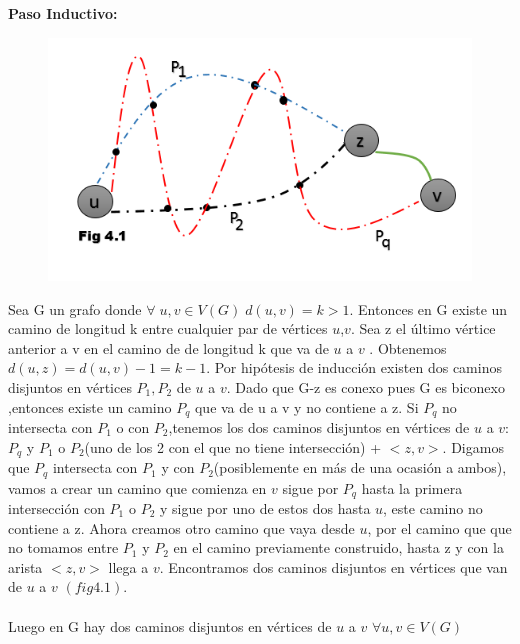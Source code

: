 \documentclass{article}
\begin{document}
    \noindent \textbf{Paso Inductivo:}\\
    \begin{figure}[H]
        \includegraphics[scale = 0.327]{img/4fig1.png}
        \centering
    \end{figure}
    \noindent Sea G un grafo donde $\forall\; u,v\in V(G)\; d(u,v)=k>1$. Entonces en G existe un camino de longitud k entre 
    cualquier par de v\'ertices $u$,$v$. Sea z el \'ultimo v\'ertice anterior a v en el camino de de longitud k que va de
    $u$ a $v$ . Obtenemos $d(u,z)=d(u,v)-1=k-1$. Por hip\'otesis de inducci\'on existen dos caminos disjuntos en v\'ertices 
    $P_{1},P_{2}$ de $u$ a $v$. Dado que G-z es conexo pues G es biconexo ,entonces existe un camino $P_{q}$ que va de u a v
    y no contiene a z. Si $P_{q}$ no intersecta con $P_{1}$ o con $P_{2}$,tenemos los dos caminos disjuntos en v\'ertices
    de $u$ a $v$: $P_{q}$ y $P_{1}$ o $P_{2}$(uno de los 2 con el que no tiene intersecci\'on) + $<z,v>$. Digamos que $P_{q}$ intersecta 
    con $P_{1}$ y con $P_{2}$(posiblemente en m\'as de una ocasi\'on  a ambos), vamos a crear un camino que comienza en $v$ sigue por $P_{q}$ hasta la primera intersecci\'on con
    $P_{1}$ o $P_{2}$ y sigue por uno de estos dos hasta $u$, este camino no contiene a z. Ahora creamos  otro camino que vaya 
    desde $u$, por el camino que que no tomamos entre $P_{1}$ y $P_{2}$ en el camino previamente construido,  hasta z y con la arista $<z,v>$ llega 
    a $v$. Encontramos dos caminos disjuntos en v\'ertices que van de $u$ a $v$ $(fig4.1)$.\\\\
    Luego en G hay dos caminos disjuntos en v\'ertices de $u$ a $v$ $\forall u,v \in V(G)$\\\\
 
\end{document}
